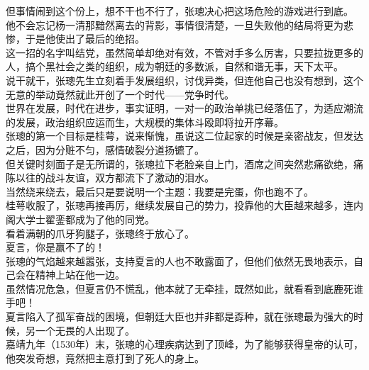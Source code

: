 \begin{multicols}{\theparacolNo}
但事情闹到这个份上，想不干也不行了，张璁决心把这场危险的游戏进行到底。\\

他不会忘记杨一清那黯然离去的背影，事情很清楚，一旦失败他的结局将更为悲惨，于是他使出了最后的绝招。\\

这一招的名字叫结党，虽然简单却绝对有效，不管对手多么厉害，只要拉拢更多的人，搞个黑社会之类的组织，成为朝廷的多数派，自然和谐无事，天下太平。\\

说干就干，张璁先生立刻着手发展组织，讨伐异类，但连他自己也没有想到，这个无意的举动竟然就此开创了一个时代——党争时代。\\

世界在发展，时代在进步，事实证明，一对一的政治单挑已经落伍了，为适应潮流的发展，政治组织应运而生，大规模的集体斗殴即将拉开序幕。\\

张璁的第一个目标是桂萼，说来惭愧，虽说这二位起家的时候是亲密战友，但发达之后，因为分赃不匀，感情破裂分道扬镳了。\\

但关键时刻面子是无所谓的，张璁拉下老脸亲自上门，酒席之间突然悲痛欲绝，痛陈以往的战斗友谊，双方都流下了激动的泪水。\\

当然绕来绕去，最后只是要说明一个主题：我要是完蛋，你也跑不了。\\

桂萼收服了，张璁再接再厉，继续发展自己的势力，投靠他的大臣越来越多，连内阁大学士翟銮都成为了他的同党。\\

看着满朝的爪牙狗腿子，张璁终于放心了。\\

夏言，你是赢不了的！\\

张璁的气焰越来越嚣张，支持夏言的人也不敢露面了，但他们依然无畏地表示，自己会在精神上站在他一边。\\

虽然情况危急，但夏言仍不慌乱，他本就了无牵挂，既然如此，就看看到底鹿死谁手吧！\\

夏言陷入了孤军奋战的困境，但朝廷大臣也并非都是孬种，就在张璁最为强大的时候，另一个无畏的人出现了。\\

嘉靖九年（1530年）末，张璁的心理疾病达到了顶峰，为了能够获得皇帝的认可，他突发奇想，竟然把主意打到了死人的身上。\\


\end{multicols}
